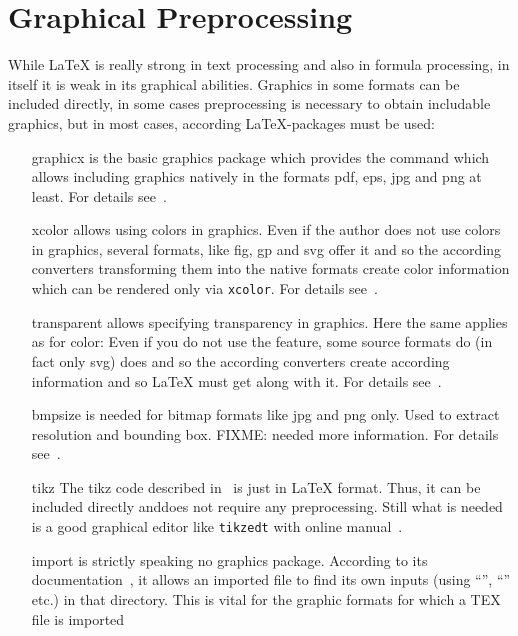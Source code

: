 
\chapter{Graphical Preprocessing}\label{chap:GraphConversions}

While \LaTeX{} is really strong in text processing 
and also in formula processing, 
in itself it is weak in its graphical abilities. 
Graphics in some formats can be included directly, 
in some cases preprocessing is necessary to obtain includable graphics, 
but in most cases, according \LaTeX-packages must be used: 
%
\begin{itemize}
\item[graphicx]
is the basic graphics package which provides the command 
which allows including graphics natively 
in the formats pdf, eps, jpg and png at least. 
For details see~\cite{GraX}. 
\item[xcolor]
allows using colors in graphics. 
Even if the author does not use colors in graphics, 
several formats, like \gls{fig}, \gls{gp} and \gls{svg} 
offer it and so the according converters 
transforming them into the native formats 
create color information which can be rendered only via \texttt{xcolor}. 
For details see~\cite{XColorP}. 
\item[transparent]
allows specifying transparency in graphics. 
Here the same applies as for color: 
Even if you do not use the feature, 
some source formats do (in fact only \gls{svg}) does 
and so the according converters create according information 
and so \LaTeX{} must get along with it. 
For details see~\cite{TransP}. 
\item[bmpsize]
is needed for bitmap formats like \gls{jpg} and \gls{png} only. 
Used to extract resolution and bounding box. 
FIXME\@: needed more information. 
For details see~\cite{BmpP}. 
\item[tikz]
The tikz code described in~\cite{TikzPGF} is just in \LaTeX{} format. 
Thus, it can be included directly anddoes not require any preprocessing. 
Still what is needed is a good graphical editor like \texttt{tikzedt} 
with online manual~\cite{TikzEdt}. 
\item[import]
is strictly speaking no graphics package. 
According to its documentation~\cite{ImpoP}, 
it allows an imported file to find its own inputs 
(using ``'', ``'' etc.) in that directory. 
This is vital for the graphic formats for which a TEX file is imported 

\end{itemize}
